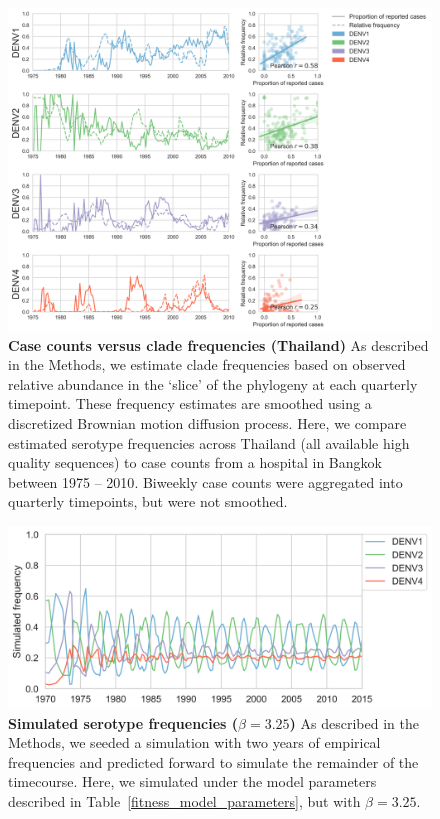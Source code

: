 \documentclass[11pt,oneside,letterpaper]{article}
\begin{document}
\begin{figure}[ht]
  \centering
  \includegraphics[width=\textwidth]{../figures/png/thai_frequencies_comparison.png}
  \caption{\textbf{Case counts versus clade frequencies (Thailand)}
  As described in the Methods, we estimate clade frequencies based on observed relative abundance in the `slice' of the phylogeny at each quarterly timepoint.
  These frequency estimates are smoothed using a discretized Brownian motion diffusion process.
  Here, we compare estimated serotype frequencies across Thailand (all available high quality sequences) to case counts from a hospital in Bangkok between 1975 -- 2010\citep{reich2013interactions}.
  Biweekly case counts were aggregated into quarterly timepoints, but were not smoothed.}
\label{thai_frequencies_comparison}
\end{figure}


\begin{figure}[ht]
  \centering
  \includegraphics[width=\textwidth]{../figures/png/simulated_frequencies_high_beta.png}
  \caption{\textbf{Simulated serotype frequencies ($\beta = 3.25$)}
  As described in the Methods, we seeded a simulation with two years of empirical frequencies and predicted forward to simulate the remainder of the timecourse.
  Here, we simulated under the model parameters described in Table~\ref{fitness_model_parameters}, but with $\beta = 3.25$. }
\label{simulation_parameter_recovery}
\end{figure}
\end{document}
